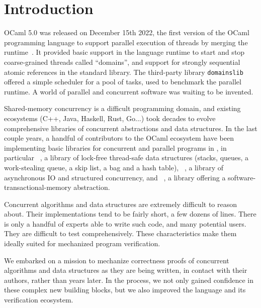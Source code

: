 \section{Introduction}
\label{sec:introduction}

OCaml 5.0 was released on December 15th 2022, the first version of the
OCaml programming language to support parallel execution of \OCaml
threads by merging the \MulticoreOCaml
runtime~\citep*{multicore-ocaml}. It provided basic support in the
language runtime to start and stop coarse-grained threads called
``domains'', and support for strongly sequential atomic references in
the standard library. The third-party library \texttt{domainslib}
offered a simple scheduler for a pool of tasks, used to benchmark the
parallel runtime. A world of parallel and concurrent software was
waiting to be invented.

Shared-memory concurrency is a difficult programming domain, and
existing ecosystems (C++, Java, Haskell, Rust, Go...) took decades to
evolve comprehensive libraries of concurrent abstractions and data
structures. In the last couple years, a handful of contributors to the
OCaml ecosystem have been implementing basic libraries for concurrent and
parallel programs in \OCaml, in particular \Saturn~\citep*{saturn},
a library of lock-free thread-safe data structures (stacks, queues,
a work-stealing queue, a skip list, a bag and a hash table),
\Eio~\citep*{eio}, a library of asynchronous IO and structured
concurrency, and \Kcas~\citep*{kcas}, a library offering
a software-transactional-memory abstraction.

Concurrent algorithms and data structures are extremely difficult to
reason about. Their implementations tend to be fairly short, a few
dozens of lines. There is only a handful of experts able to write such
code, and many potential users. They are difficult to test
comprehensively. These characteristics make them ideally suited for
mechanized program verification.

We embarked on a mission to mechanize correctness proofs of \OCaml
concurrent algorithms and data structures as they are being written,
in contact with their authors, rather than years later. In the
process, we not only gained confidence in these complex new building
blocks, but we also improved the \OCaml language and its verification
ecosystem.

